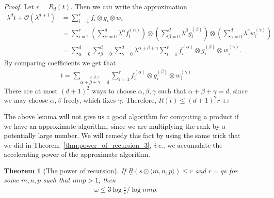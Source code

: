 \documentclass{article}
\theoremstyle{plain}
\newtheorem{theorem}{Theorem}
\theoremstyle{definition}
\theoremstyle{remark}
\begin{document}
\begin{proof}
Let $r = R_d(t)$. Then we can write the approximation
\begin{align*}
    \lambda^d t + \mathcal{O}(\lambda^{d+1}) &= \sum_{i=1}^r f_i \otimes g_i \otimes w_i \\
    &= \sum_{i=1}^r \left(\sum_{\alpha=0}^d \lambda^\alpha f_i^{(\alpha)} \right) \otimes \left(\sum_{\beta=0}^d \lambda^\beta g_i^{(\beta)} \right) \otimes \left(\sum_{\gamma=0}^d \lambda^\gamma w_i^{(\gamma)} \right) \\
    &= \sum_{\alpha=0}^d \sum_{\beta=0}^d \sum_{\gamma=0}^d \lambda^{\alpha + \beta + \gamma} \sum_{i=1}^r f_i^{(\alpha)} \otimes g_i^{(\beta)} \otimes w_i^{(\gamma)}.
\end{align*}
By comparing coefficients we get that
\begin{align*}
    t = \sum_{\stackrel{\alpha, \beta, \gamma}{\alpha + \beta + \gamma = d}} \sum_{i=1}^r f_i^{(\alpha)} \otimes g_i^{(\beta)} \otimes w_i^{(\gamma)}
\end{align*}
There are at most $(d+1)^2$ ways to choose $\alpha, \beta, \gamma$ such that $\alpha + \beta + \gamma = d$, since we may choose $\alpha, \beta$ freely, which fixes $\gamma$. Therefore, $R(t) \leq (d+1)^2 r$
\end{proof}

The above lemma will not give us a good algorithm for computing a product if we have an approximate algorithm, since we are multiplying the rank by a potentially large number. We will remedy this fact by using the same trick that we did in Theorem~\ref{thm:power_of_recursion_3}, \emph{i.e.}, we accumulate the accelerating power of the approximate algorithm.

\begin{theorem}[The power of recursion]\label{thm:power_of_recursion_4}
If $\underline{R}(s \odot \langle m, n, p \rangle) \leq r$ and $r = qs$ for some $m, n, p$ such that $mnp > 1$, then
\begin{align*}
    \omega \leq 3 \log \frac{r}{s} / \log mnp.
\end{align*}
\end{theorem}
\end{document}
